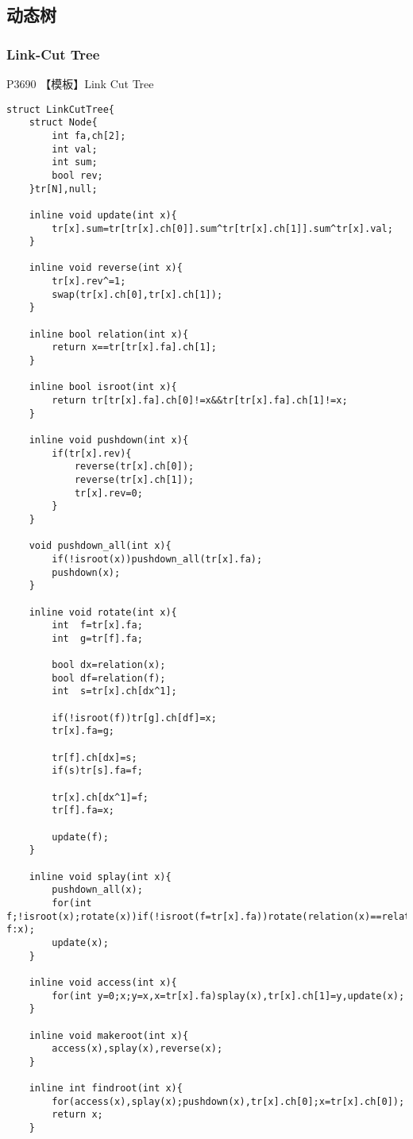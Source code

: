 \documentclass{ctexart}
\begin{document}
\subsection{动态树}
\subsubsection{Link-Cut Tree}
P3690 【模板】Link Cut Tree
\begin{lstlisting}
struct LinkCutTree{
	struct Node{
		int fa,ch[2];
		int val;
		int sum;
		bool rev;
	}tr[N],null;
	
	inline void update(int x){
		tr[x].sum=tr[tr[x].ch[0]].sum^tr[tr[x].ch[1]].sum^tr[x].val;
	}
	
    inline void reverse(int x){
        tr[x].rev^=1;
        swap(tr[x].ch[0],tr[x].ch[1]);
    }
    
	inline bool relation(int x){
		return x==tr[tr[x].fa].ch[1];
	}
	
	inline bool isroot(int x){
		return tr[tr[x].fa].ch[0]!=x&&tr[tr[x].fa].ch[1]!=x;
	}
	
	inline void pushdown(int x){
		if(tr[x].rev){
			reverse(tr[x].ch[0]);
			reverse(tr[x].ch[1]);
			tr[x].rev=0;
		}
	}
	
    void pushdown_all(int x){
    	if(!isroot(x))pushdown_all(tr[x].fa);
    	pushdown(x);
    }
    
    inline void rotate(int x){
        int  f=tr[x].fa;
        int  g=tr[f].fa;
        
        bool dx=relation(x);
        bool df=relation(f);
        int  s=tr[x].ch[dx^1];
        
        if(!isroot(f))tr[g].ch[df]=x;
        tr[x].fa=g;
        
        tr[f].ch[dx]=s;
        if(s)tr[s].fa=f;
        
        tr[x].ch[dx^1]=f;
        tr[f].fa=x;
        
        update(f);
    }
    
    inline void splay(int x){
    	pushdown_all(x);
        for(int f;!isroot(x);rotate(x))if(!isroot(f=tr[x].fa))rotate(relation(x)==relation(f)?f:x);
        update(x);
    }
    
	inline void access(int x){
		for(int y=0;x;y=x,x=tr[x].fa)splay(x),tr[x].ch[1]=y,update(x);
	}
	
	inline void makeroot(int x){
		access(x),splay(x),reverse(x);
	}
	
	inline int findroot(int x){
		for(access(x),splay(x);pushdown(x),tr[x].ch[0];x=tr[x].ch[0]);
		return x;
	}
	

\end{lstlisting}
\end{document}

